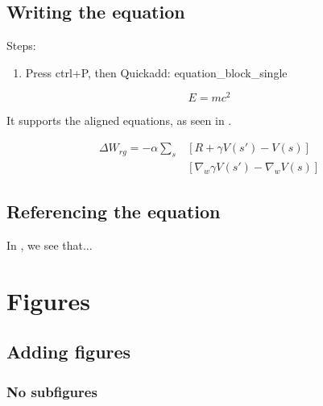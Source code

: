 \documentclass{doc_class_fontsize}{extarticle}
\begin{document}
\subsection{Writing the equation}



Steps:



\begin{enumerate}
\item Press ctrl+P, then Quickadd: equation\_block\_single
\end{enumerate}



\begin{equation} \label{eq:Einstein}
	E=mc^{2}
\end{equation}





It supports the aligned equations, as seen in .




\begin{equation}\label{eq:1}
\begin{aligned}
\Delta W_{rg} = -\alpha \sum_{s}&[R+\gamma V(s')-V(s)]  \\
&[\nabla_{w} \gamma V(s')-\nabla_{w}V(s)]
\end{aligned}
\end{equation}



\subsection{Referencing the equation}

In , we see that...

\section{Figures}

\subsection{Adding figures}

\subsubsection{No subfigures}
\end{document}
